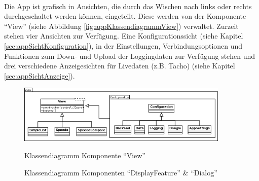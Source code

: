 \paragraph{}

Die App ist grafisch in Ansichten, die durch das Wischen nach links oder rechts durchgeschaltet werden können, eingeteilt. Diese werden von der Komponente \enquote{View} (siehe Abbildung \ref{fig:appKlassendiagrammView}) verwaltet. Zurzeit stehen vier Ansichten zur Verfügung. Eine Konfigurationssicht (siehe Kapitel \ref{sec:appSichtKonfiguration}), in der Einstellungen, Verbindungsoptionen und Funktionen zum Down- und Upload der Loggingdaten zur Verfügung stehen und drei verschiedene Anzeigesichten für Livedaten (z.B. Tacho) (siehe Kapitel \ref{sec:appSichtAnzeige}).

\begin{figure}[H]
  \begin{center}
    \includegraphics[width=0.9\textwidth]{./img/App_Klassendiagramm_View}
    \caption{Klassendiagramm Komponente \enquote{View}}
    \label{fig:appKlassendiagrammView}
	\label{fig:appKlassendiagrammDisplayFeature}
    \label{fig:appKlassendiagrammDialog}
	\caption{Klassendiagramm Komponenten \enquote{DisplayFeature} \& \enquote{Dialog}}
	\label{fig:appKlassendiagrammDisplayFeatureDialog}
  \end{center}
\end{figure}

